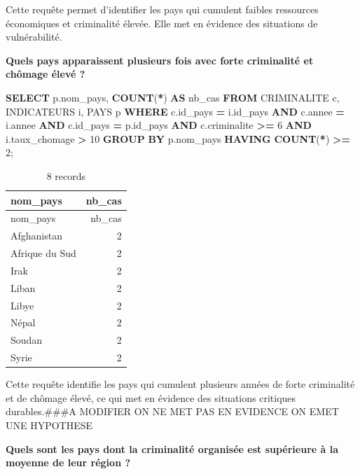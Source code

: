 \documentclass[mstat,12pt]{unswthesis}
\newenvironment{Shaded}{\begin{snugshade}}{\end{snugshade}}
\newcommand{\DecValTok}[1]{\textcolor[rgb]{0.00,0.00,0.81}{#1}}
\newcommand{\FunctionTok}[1]{\textcolor[rgb]{0.13,0.29,0.53}{\textbf{#1}}}
\newcommand{\KeywordTok}[1]{\textcolor[rgb]{0.13,0.29,0.53}{\textbf{#1}}}
\newcommand{\NormalTok}[1]{#1}
\newcommand{\OperatorTok}[1]{\textcolor[rgb]{0.81,0.36,0.00}{\textbf{#1}}}
\begin{document}
Cette requête permet d'identifier les pays qui cumulent faibles
ressources économiques et criminalité élevée. Elle met en évidence des
situations de vulnérabilité.

\textbf{Quels pays apparaissent plusieurs fois avec forte criminalité et
chômage élevé ?}

\begin{Shaded}
\begin{Highlighting}[]
\KeywordTok{SELECT}\NormalTok{ p.nom\_pays, }\FunctionTok{COUNT}\NormalTok{(}\OperatorTok{*}\NormalTok{) }\KeywordTok{AS}\NormalTok{ nb\_cas }
\KeywordTok{FROM}\NormalTok{ CRIMINALITE c, INDICATEURS i, PAYS p }
\KeywordTok{WHERE}\NormalTok{ c.id\_pays }\OperatorTok{=}\NormalTok{ i.id\_pays }\KeywordTok{AND}\NormalTok{ c.annee }\OperatorTok{=}\NormalTok{ i.annee }
\KeywordTok{AND}\NormalTok{ c.id\_pays }\OperatorTok{=}\NormalTok{ p.id\_pays }\KeywordTok{AND}\NormalTok{ c.criminalite }\OperatorTok{\textgreater{}=} \DecValTok{6} 
\KeywordTok{AND}\NormalTok{ i.taux\_chomage }\OperatorTok{\textgreater{}} \DecValTok{10} \KeywordTok{GROUP} \KeywordTok{BY}\NormalTok{ p.nom\_pays }\KeywordTok{HAVING} \FunctionTok{COUNT}\NormalTok{(}\OperatorTok{*}\NormalTok{) }\OperatorTok{\textgreater{}=} \DecValTok{2}\NormalTok{;}
\end{Highlighting}
\end{Shaded}

\begin{longtable}[]{@{}lr@{}}
\caption{8 records}\tabularnewline
\toprule\noalign{}
nom\_pays & nb\_cas \\
\midrule\noalign{}
\endfirsthead
\toprule\noalign{}
nom\_pays & nb\_cas \\
\midrule\noalign{}
\endhead
\bottomrule\noalign{}
\endlastfoot
Afghanistan & 2 \\
Afrique du Sud & 2 \\
Irak & 2 \\
Liban & 2 \\
Libye & 2 \\
Népal & 2 \\
Soudan & 2 \\
Syrie & 2 \\
\end{longtable}

Cette requête identifie les pays qui cumulent plusieurs années de forte
criminalité et de chômage élevé, ce qui met en évidence des situations
critiques durables.\#\#\#A MODIFIER ON NE MET PAS EN EVIDENCE ON EMET
UNE HYPOTHESE

\textbf{Quels sont les pays dont la criminalité organisée est supérieure
à la moyenne de leur région ?}
\end{document}
